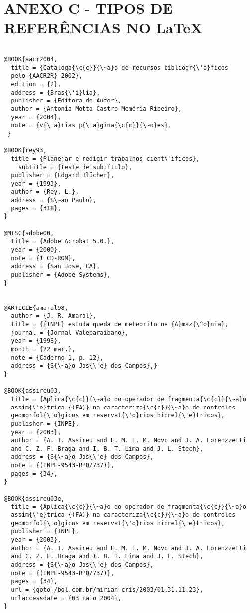 \renewcommand{\thechapter}{}%
\chapter{ANEXO C - TIPOS DE REFERÊNCIAS NO \LaTeX} %
\label{anexoC} %
\renewcommand{\thechapter}{C}%

\begin{verbatim}

@BOOK{aacr2004, 
  title = {Cataloga{\c{c}}{\~a}o de recursos bibliogr{\'a}ficos 
  pelo {AACR2R} 2002}, 
  edition = {2},
  address = {Bras{\'i}lia},
  publisher = {Editora do Autor},
  author = {Antonia Motta Castro Memória Ribeiro},
  year = {2004}, 
  note = {v{\'a}rias p{\'a}gina{\c{c}}{\~o}es},
 }

@BOOK{rey93,
  title = {Planejar e redigir trabalhos cient\'ificos},
	subtitle = {teste de subtítulo},
  publisher = {Edgard Blücher},
  year = {1993},
  author = {Rey, L.},
  address = {S\~ao Paulo},
  pages = {318},
} 

@MISC{adobe00,
  title = {Adobe Acrobat 5.0.},
  year = {2000},
  note = {1 CD-ROM},
  address = {San Jose, CA},
  publisher = {Adobe Systems},
}


@ARTICLE{amaral98,
  author = {J. R. Amaral},
  title = {{INPE} estuda queda de meteorito na {A}maz{\^o}nia},
  journal = {Jornal Valeparaibano},
  year = {1998},
  month = {22 mar.},
  note = {Caderno 1, p. 12},
  address = {S{\~a}o Jos{\'e} dos Campos},}
}

@BOOK{assireu03,
  title = {Aplica{\c{c}}{\~a}o do operador de fragmenta{\c{c}}{\~a}o  
  assim{\'e}trica {(FA)} na caracteriza{\c{c}}{\~a}o de controles 
  geomorfol{\'o}gicos em reservat{\'o}rios hidrel{\'e}tricos},
  publisher = {INPE},
  year = {2003},
  author = {A. T. Assireu and E. M. L. M. Novo and J. A. Lorenzzetti 
  and C. Z.	F. Braga and I. B. T. Lima and J. L. Stech},
  address = {S{\~a}o Jos{\'e} dos Campos},
  note = {(INPE-9543-RPQ/737)},
  pages = {34},
}

@BOOK{assireu03e,
  title = {Aplica{\c{c}}{\~a}o do operador de fragmenta{\c{c}}{\~a}o 
  assim{\'e}trica {(FA)} na caracteriza{\c{c}}{\~a}o de controles 
  geomorfol{\'o}gicos em reservat{\'o}rios hidrel{\'e}tricos},
  publisher = {INPE},
  year = {2003},
  author = {A. T. Assireu and E. M. L. M. Novo and J. A. Lorenzzetti 
  and C. Z.	F. Braga and I. B. T. Lima and J. L. Stech},
  address = {S{\~a}o Jos{\'e} dos Campos},
  note = {(INPE-9543-RPQ/737)},
  pages = {34},
  url = {goto-/bol.com.br/mirian_cris/2003/01.31.11.23},
  urlaccessdate = {03 maio 2004},
}


\end{verbatim}
